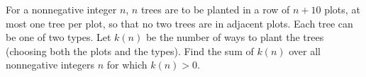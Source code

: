 For a nonnegative integer $n$, $n$ trees are to be planted in a row of $n+10$ plots, at most one tree per plot, so that no two trees are in adjacent plots. Each tree can be one of two types. Let $k(n)$ be the number of ways to plant the trees (choosing both the plots and the types). Find the sum of $k(n)$ over all nonnegative integers $n$ for which $k(n)>0$.
